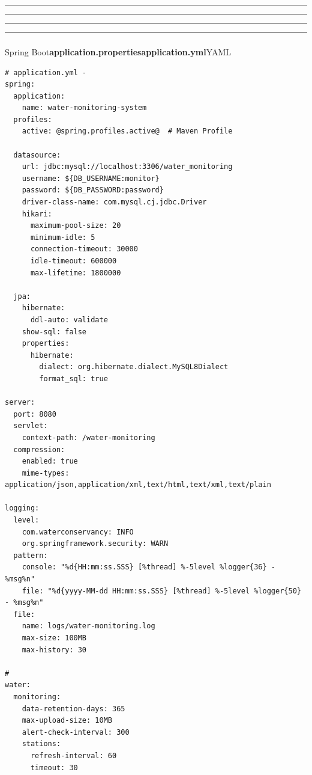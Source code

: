 \begin{center}\rule{0.5\linewidth}{0.5pt}\end{center}

\begin{center}\rule{0.5\linewidth}{0.5pt}\end{center}

\begin{center}\rule{0.5\linewidth}{0.5pt}\end{center}

\begin{center}\rule{0.5\linewidth}{0.5pt}\end{center}

\subsubsection{}\label{section-19}

Spring Boot\textbf{application.propertiesapplication.yml}YAML

\begin{verbatim}
# application.yml - 
spring:
  application:
    name: water-monitoring-system
  profiles:
    active: @spring.profiles.active@  # Maven Profile
  
  datasource:
    url: jdbc:mysql://localhost:3306/water_monitoring
    username: ${DB_USERNAME:monitor}
    password: ${DB_PASSWORD:password}
    driver-class-name: com.mysql.cj.jdbc.Driver
    hikari:
      maximum-pool-size: 20
      minimum-idle: 5
      connection-timeout: 30000
      idle-timeout: 600000
      max-lifetime: 1800000

  jpa:
    hibernate:
      ddl-auto: validate
    show-sql: false
    properties:
      hibernate:
        dialect: org.hibernate.dialect.MySQL8Dialect
        format_sql: true

server:
  port: 8080
  servlet:
    context-path: /water-monitoring
  compression:
    enabled: true
    mime-types: application/json,application/xml,text/html,text/xml,text/plain

logging:
  level:
    com.waterconservancy: INFO
    org.springframework.security: WARN
  pattern:
    console: "%d{HH:mm:ss.SSS} [%thread] %-5level %logger{36} - %msg%n"
    file: "%d{yyyy-MM-dd HH:mm:ss.SSS} [%thread] %-5level %logger{50} - %msg%n"
  file:
    name: logs/water-monitoring.log
    max-size: 100MB
    max-history: 30

# 
water:
  monitoring:
    data-retention-days: 365
    max-upload-size: 10MB
    alert-check-interval: 300
    stations:
      refresh-interval: 60
      timeout: 30
\end{verbatim}

